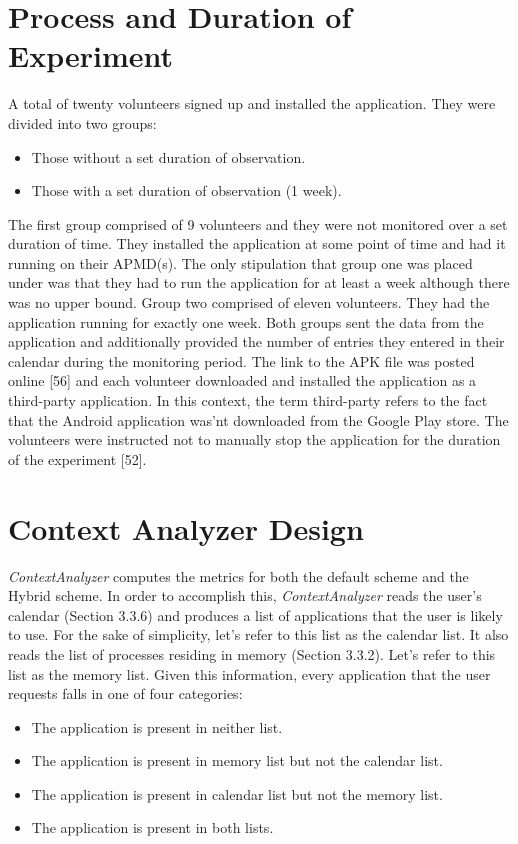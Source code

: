 \documentclass[12pt]{uthesis-v12}  %
\begin{document}
	\section{Process and Duration of Experiment}
		A total of twenty volunteers signed up and installed the application. They were divided into two groups:
		
		\begin{itemize}
			\item Those without a set duration of observation.
			\item Those with a set duration of observation (1 week).
		\end{itemize}
		
		The first group comprised of 9 volunteers and they were not monitored over a set duration of time. They installed the application at some point of time and had it running on their APMD(s). The only stipulation that group one was placed under was that they had to run the application for at least a week although there was no upper bound. Group two comprised of eleven volunteers. They had the application running for exactly one week. Both groups sent the data from the application and additionally provided the number of  entries they entered in their calendar during the monitoring period. The link to the APK file was posted online [56] and each volunteer downloaded and installed the application as a third-party application. In this context, the term third-party refers to the fact that the Android application was'nt downloaded from the Google Play store. The volunteers were instructed not to manually stop the application for the duration of the experiment [52].
		 		 
	\section{Context Analyzer Design}
		{\em ContextAnalyzer} computes the metrics for both the default scheme and the Hybrid scheme. In order to  accomplish this, {\em ContextAnalyzer} reads the user's calendar (Section 3.3.6) and produces a list of applications that the user is likely to use. For the sake of simplicity, let's refer to this list as the calendar list. It also reads the list of processes residing in memory (Section 3.3.2). Let's refer to this list as the memory list. Given this information, every application that the user requests falls in one of four categories:
		
		\begin{itemize}
			\item The application is present in neither list.
			\item The application is present in memory list but not the calendar list.
			\item The application is present in calendar list but not the memory list.
			\item The application is present in both lists. 
		\end{itemize}  
		
\end{document}

